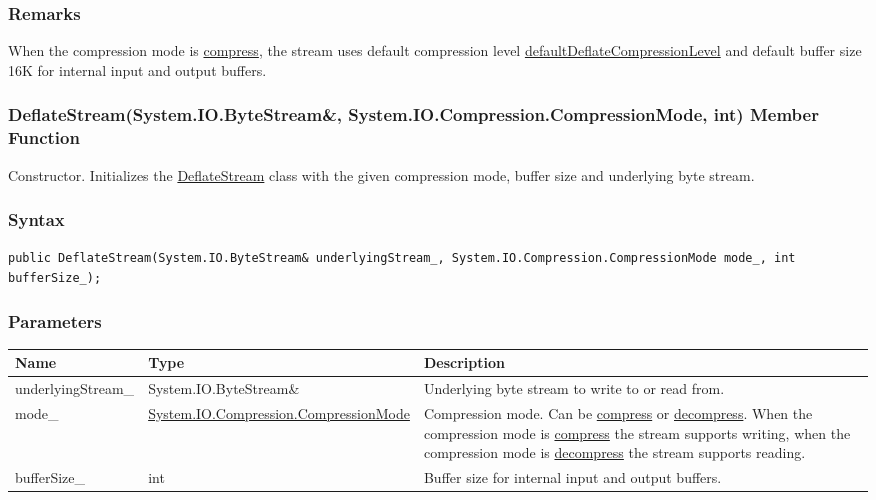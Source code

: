 \documentclass[a4paper,oneside,11.000000pt]{book}
\begin{document}
\subsubsection*{Remarks}
\begin{flushleft}
When the compression mode is \hyperlink{System.IO.Compression.CompressionMode.compress}{compress}, the stream uses default compression level \hyperlink{System.IO.Compression.defaultDeflateCompressionLevel}{defaultDeflateCompressionLevel}
and default buffer size 16K for internal input and output buffers.

\end{flushleft}
\clearpage

\hypertarget{System.IO.Compression.DeflateStream.constructor.P.System.IO.Compression.DeflateStream.R.System.IO.ByteStream.System.IO.Compression.CompressionMode.int}{\subsubsection*{DeflateStream(System.IO.ByteStream\&, System.IO.Compression.CompressionMode, int) Member Function}}
\begin{flushleft}
Constructor. Initializes the \hyperlink{System.IO.Compression.DeflateStream}{DeflateStream} class with the given compression mode, buffer size and underlying byte stream.

\end{flushleft}
\subsubsection*{Syntax}
\texttt{public DeflateStream(System.IO.ByteStream\& underlyingStream\_, System.IO.Compression.CompressionMode mode\_, int bufferSize\_);}
\subsubsection*{Parameters}
\begin{flushleft}
\begin{supertabular}[l]{!{\raggedright}p{4.10323cm}!{\raggedright}p{5.76344cm}!{\raggedright}p{4.93333cm}}
\textbf{Name}
& \textbf{Type}
& \textbf{Description}
\\
\hline
underlyingStream\_
& System.\-IO.\-ByteStream\&\-
& Underlying byte stream to write to or read from.

\\
mode\_
& \hyperlink{System.IO.Compression.CompressionMode}{System.\-IO.\-Compression.\-CompressionMode}
& Compression mode. Can be \hyperlink{System.IO.Compression.CompressionMode.compress}{compress} or \hyperlink{System.IO.Compression.CompressionMode.decompress}{decompress}.
When the compression mode is \hyperlink{System.IO.Compression.CompressionMode.compress}{compress} the stream supports writing,
when the compression mode is \hyperlink{System.IO.Compression.CompressionMode.decompress}{decompress} the stream supports reading.

\\
bufferSize\_
& int
& Buffer size for internal input and output buffers.

\\
\end{supertabular}

\end{flushleft}
\end{document}
